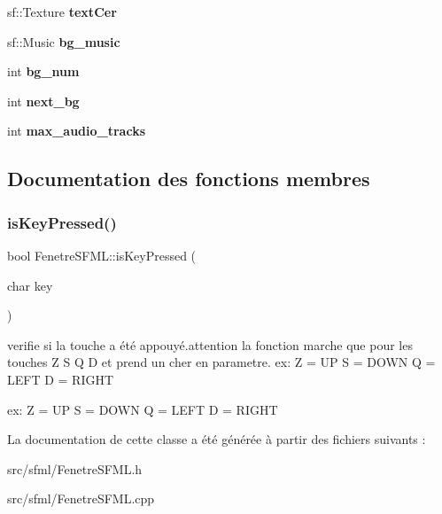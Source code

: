 \begin{DoxyCompactItemize}
sf\+::\+Texture {\bfseries text\+Cer}
\item 
\mbox{\label{class_fenetre_s_f_m_l_afbb394b8579c5cbaa5c08b3faaf186b2}} 
sf\+::\+Music {\bfseries bg\+\_\+music}
\item 
\mbox{\label{class_fenetre_s_f_m_l_a0603f9acefe20e98d8a75b852b610512}} 
int {\bfseries bg\+\_\+num}
\item 
\mbox{\label{class_fenetre_s_f_m_l_a4575c8bbf39a2a25e593e227bdffec0f}} 
int {\bfseries next\+\_\+bg}
\item 
\mbox{\label{class_fenetre_s_f_m_l_ac66ddc51a61c1fa715b58cd8e594faff}} 
int {\bfseries max\+\_\+audio\+\_\+tracks}
\end{DoxyCompactItemize}


\subsection{Documentation des fonctions membres}
\mbox{\label{class_fenetre_s_f_m_l_ac7c527412448d905ff45f7966b234196}} 
\subsubsection{\texorpdfstring{is\+Key\+Pressed()}{isKeyPressed()}}
{\footnotesize\ttfamily bool Fenetre\+S\+F\+M\+L\+::is\+Key\+Pressed (\begin{DoxyParamCaption}\item[{char}]{key }\end{DoxyParamCaption})}



verifie si la touche a été appouyé.\+attention la fonction marche que pour les touches Z S Q D et prend un cher en parametre. ex\+: Z = UP S = D\+O\+WN Q = L\+E\+FT D = R\+I\+G\+HT 

ex\+: Z = UP S = D\+O\+WN Q = L\+E\+FT D = R\+I\+G\+HT 

La documentation de cette classe a été générée à partir des fichiers suivants \+:\begin{DoxyCompactItemize}
\item 
src/sfml/Fenetre\+S\+F\+M\+L.\+h\item 
src/sfml/Fenetre\+S\+F\+M\+L.\+cpp\end{DoxyCompactItemize}
